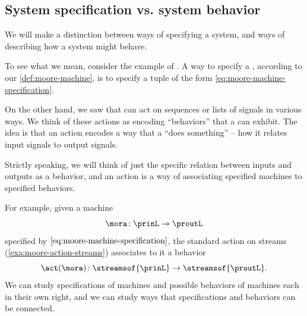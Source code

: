 {

\subsection{System specification vs. system behavior}

We will make a distinction between ways of specifying a system, and ways of describing how a system might behave.

To see what we mean, consider the example of .
A way to specify a , according to our \cref{def:moore-machine}, is to specify a tuple of the form \cref{eq:moore-machine-specification}.

On the other hand, we saw that  can act on sequences or lists of signals in various ways.
We think of these actions as encoding ``behaviors'' that a  can exhibit.
The idea is that an action encodes a way that a  ``does something'' -- how it relates input signals to output signals.

Strictly speaking, we will think of just the specific relation between inputs and outputs as a behavior, and an action is a way of associating specified machines to specified behaviors.


For example, given a machine
\begin{equation}
    \mora \colon \prinL \to \proutL
\end{equation}
specified by $\cref{eq:moore-machine-specification}$, the standard action on streams (\cref{exa:moore-action-streams}) associates to it a behavior
\begin{equation}
    \act(\mora) \colon \streamsof{\prinL} \to \streamsof{\proutL}.
\end{equation}
We can study specifications of machines and possible behaviors of machines each in their own right, and we can study ways that specifications and behaviors can be connected.




}